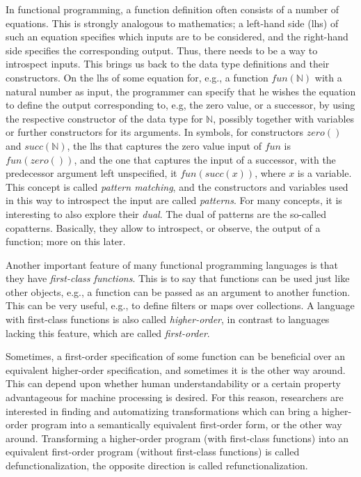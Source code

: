 In functional programming, a function definition often consists of a number of equations. This is strongly analogous to mathematics; a left-hand side (lhs) of such an equation specifies which inputs are to be considered, and the right-hand side specifies the corresponding output. Thus, there needs to be a way to introspect inputs. This brings us back to the data type definitions and their constructors. On the lhs of some equation for, e.g., a function $fun(\mathbb{N})$ with a natural number as input, the programmer can specify that he wishes the equation to define the output corresponding to, e.g, the zero value, or a successor, by using the respective constructor of the data type for $\mathbb{N}$, possibly together with variables or further constructors for its arguments. In symbols, for constructors $zero()$ and $succ(\mathbb{N})$, the lhs that captures the zero value input of $fun$ is $fun(zero())$, and the one that captures the input of a successor, with the predecessor argument left unspecified, it $fun(succ(x))$, where $x$ is a variable. This concept is called \textit{pattern matching}, and the constructors and variables used in this way to introspect the input are called \textit{patterns}. For many concepts, it is interesting to also explore their \textit{dual}. The dual of patterns are the so-called copatterns. Basically, they allow to introspect, or observe, the output of a function; more on this later.

Another important feature of many functional programming languages is that they have \textit{first-class functions}. This is to say that functions can be used just like other objects, e.g., a function can be passed as an argument to another function. This can be very useful, e.g., to define filters or maps over collections. A language with first-class functions is also called \textit{higher-order}, in contrast to languages lacking this feature, which are called \textit{first-order}.

Sometimes, a first-order specification of some function can be beneficial over an equivalent higher-order specification, and sometimes it is the other way around. This can depend upon whether human understandability or a certain property advantageous for machine processing is desired. For this reason, researchers are interested in finding and automatizing transformations which can bring a higher-order program into a semantically equivalent first-order form, or the other way around. Transforming a higher-order program (with first-class functions) into an equivalent first-order program (without first-class functions) is called defunctionalization, the opposite direction is called refunctionalization.

